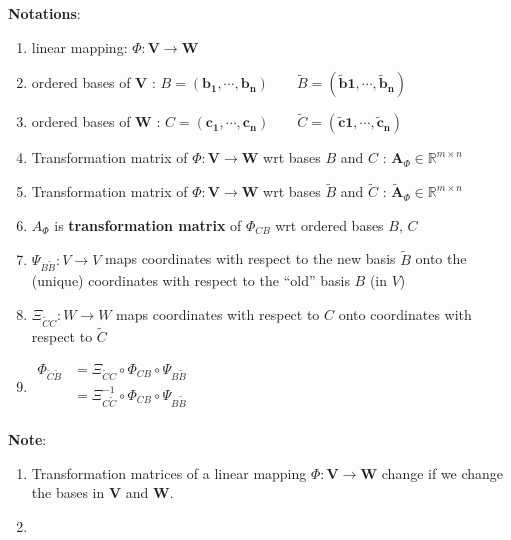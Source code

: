 \noindent\textbf{Notations}:
\begin{enumerate}
    \item linear mapping:  $\Phi : \mathbf{V \to W}$

    \item ordered bases of $\mathbf{V}$ : \(         \mathit{B} = \mathbf{(b_1, \cdots , b_n)} \quad\quad \tilde{\mathit{B}} = \mathbf{( \tilde{b}1, \cdots , \tilde{b}_n)}     \)

    \item ordered bases of $\mathbf{W}$ : \( \mathit{C} = \mathbf{(c_1, \cdots , c_n)} \quad\quad \tilde{\mathit{C}} = \mathbf{( \tilde{c}1, \cdots , \tilde{c}_n)} \)

    \item Transformation matrix of $\Phi: \mathbf{V} \to \mathbf{W}$ wrt bases $\mathit{B}$ and $\mathit{C}$ : $\mathbf{A}_\Phi \in \mathbb{R}^{m \times n}$

    \item Transformation matrix of $\Phi: \mathbf{V} \to \mathbf{W}$ wrt bases $\tilde{\mathit{B}}$ and $\tilde{\mathit{C}}$ : $\tilde{\mathbf{A}}_\Phi \in \mathbb{R}^{m \times n}$

    \item $A_\Phi$ is \textbf{transformation matrix} of $\Phi_{CB}$ wrt ordered bases $B$, $C$\\

    \item $\Psi_{B\tilde{B}} : V \to V$ maps coordinates with respect to the new basis $\tilde{B}$ onto the (unique) coordinates with respect to the “old” basis $B$ (in $V$)

    \item $\Xi_{\tilde{C}C} : W \to W$ maps coordinates with respect to $C$ onto coordinates with respect to $\tilde{C}$

    \item  $\begin{aligned}
        \Phi_{\tilde{C}\tilde{B}}  
        &= \Xi_{\tilde{C}C} \circ \Phi_{CB} \circ \Psi_{B\tilde{B}} \\ 
        &= \Xi^{-1}_{C\tilde{C}} \circ \Phi_{CB} \circ \Psi_{B\tilde{B}} \\ 
    \end{aligned}$ 
    
\end{enumerate}

\vspace{0.2cm}
\noindent \textbf{Note}:
\begin{enumerate}
    \item Transformation matrices of a linear mapping $\Phi : \mathbf{V \to W}$ change if we change the bases in $\mathbf{V}$ and $\mathbf{W}$.

    \item 
\end{enumerate}

